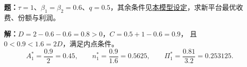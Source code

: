 \begin{examplebox}[title={\PriorityImportant\quad 例题：新平台收费}]
\textbf{题：}$\tau=1$、$\beta_1=\beta_2=0.6$、$q=0.5$，其余条件见\hyperref[kp:new-network]{本模型设定}，求新平台最优收费、份额与利润。

\textbf{解：}$D=2-0.6-0.6=0.8>0$，$C=0.5+1-0.6=0.9$，
且 $0<0.9<1.6=2D$，满足内点条件。
\[
A_1^*=\frac{0.9}{2}=0.45,\qquad
n_1^*=\frac{0.9}{1.6}=0.5625,\qquad
\Pi_1^*=\frac{0.81}{3.2}=0.253125.
\]
\end{examplebox}
